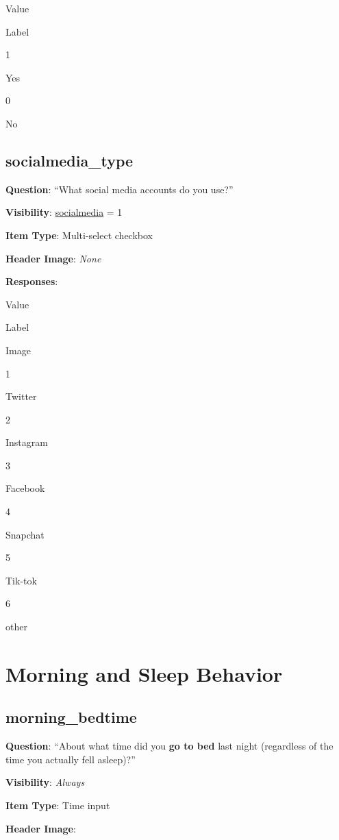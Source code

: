 \documentclass[]{book}
\begin{document}
Value

Label

1

Yes

0

No

\hypertarget{socialmedia_type}{%
\section{socialmedia\_type}\label{socialmedia_type}}

\textbf{Question}: ``What social media accounts do you use?''

\textbf{Visibility}: \protect\hyperlink{socialmedia}{socialmedia} = 1

\textbf{Item Type}: Multi-select checkbox

\textbf{Header Image}: \emph{None}

\textbf{Responses}:

Value

Label

Image

1

Twitter

2

Instagram

3

Facebook

4

Snapchat

5

Tik-tok

6

other

\hypertarget{morning_section}{%
\chapter{Morning and Sleep Behavior}\label{morning_section}}

\hypertarget{morning_bedtime}{%
\section{morning\_bedtime}\label{morning_bedtime}}

\textbf{Question}: ``About what time did you \textbf{go to bed} last night (regardless of the time you actually fell asleep)?''

\textbf{Visibility}: \emph{Always}

\textbf{Item Type}: Time input

\textbf{Header Image}:
\end{document}

